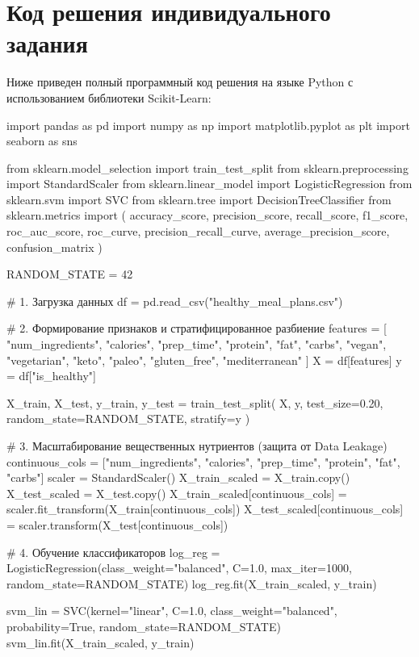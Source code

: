 \documentclass[14pt,a4paper]{extarticle}
\begin{document}
\section{Код решения индивидуального задания}

Ниже приведен полный программный код решения на языке Python с использованием библиотеки Scikit-Learn:

\begin{CodeListing}
import pandas as pd
import numpy as np
import matplotlib.pyplot as plt
import seaborn as sns

from sklearn.model_selection import train_test_split
from sklearn.preprocessing import StandardScaler
from sklearn.linear_model import LogisticRegression
from sklearn.svm import SVC
from sklearn.tree import DecisionTreeClassifier
from sklearn.metrics import (
    accuracy_score, precision_score, recall_score, f1_score,
    roc_auc_score, roc_curve, precision_recall_curve,
    average_precision_score, confusion_matrix
)

RANDOM_STATE = 42

# 1. Загрузка данных
df = pd.read_csv("healthy_meal_plans.csv")

# 2. Формирование признаков и стратифицированное разбиение
features = [
    "num_ingredients", "calories", "prep_time", "protein", "fat", "carbs",
    "vegan", "vegetarian", "keto", "paleo", "gluten_free", "mediterranean"
]
X = df[features]
y = df["is_healthy"]

X_train, X_test, y_train, y_test = train_test_split(
    X, y, test_size=0.20, random_state=RANDOM_STATE, stratify=y
)

# 3. Масштабирование вещественных нутриентов (защита от Data Leakage)
continuous_cols = ["num_ingredients", "calories", "prep_time", "protein", "fat", "carbs"]
scaler = StandardScaler()
X_train_scaled = X_train.copy()
X_test_scaled = X_test.copy()
X_train_scaled[continuous_cols] = scaler.fit_transform(X_train[continuous_cols])
X_test_scaled[continuous_cols] = scaler.transform(X_test[continuous_cols])

# 4. Обучение классификаторов
log_reg = LogisticRegression(class_weight="balanced", C=1.0, max_iter=1000, random_state=RANDOM_STATE)
log_reg.fit(X_train_scaled, y_train)

svm_lin = SVC(kernel="linear", C=1.0, class_weight="balanced", probability=True, random_state=RANDOM_STATE)
svm_lin.fit(X_train_scaled, y_train)


\end{CodeListing}
\end{document}
